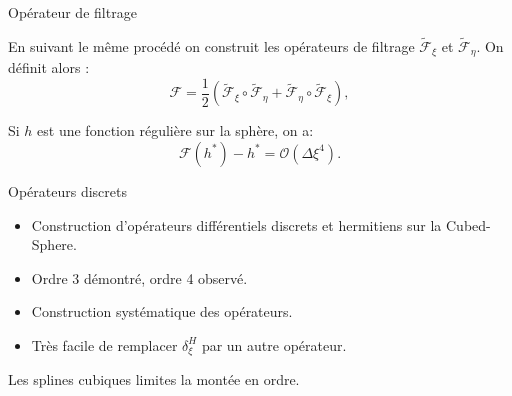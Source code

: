 \documentclass[11pt]{beamer}
\def\fxi{\tilde{\mathcal{F}}_{\xi}}
\def\feta{\tilde{\mathcal{F}}_{\eta}}
\begin{document}
\begin{frame}{Opérateur de filtrage}

En suivant le même procédé on construit les opérateurs de filtrage $\fxi$ et $\feta$. On définit alors :
$$
\mathcal{F} = \dfrac{1}{2} \left( \fxi \circ \feta + \feta \circ \fxi \right),
$$

\begin{block}{}
Si $h$ est une fonction régulière sur la sphère, on a:
$$
\mathcal{F}(h^*) - h^* = \mathcal{O} \left( \Delta \xi^4 \right).
$$
\end{block}
\end{frame}









\begin{frame}{Opérateurs discrets}
\begin{block}{}
\begin{itemize}
\item Construction d'opérateurs différentiels discrets et hermitiens sur la Cubed-Sphere.
\item Ordre 3 démontré, ordre 4 observé.
\end{itemize}
\end{block}

\begin{block}{}
\begin{itemize}
\item Construction systématique des opérateurs.
\item Très facile de remplacer $\delta_{\xi}^H$ par un autre opérateur. 
\end{itemize}
\end{block}

\begin{alertblock}{}
Les splines cubiques limites la montée en ordre.
\end{alertblock}

\end{frame}










\end{document}
